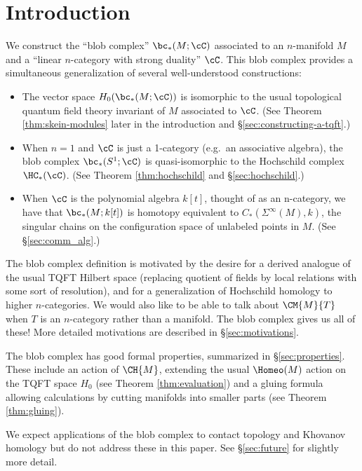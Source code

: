 
\section{Introduction}

We construct the ``blob complex'' $\bc_*(M; \cC)$ associated to an $n$-manifold $M$ and a ``linear $n$-category with strong duality'' $\cC$.
This blob complex provides a simultaneous generalization of several well-understood constructions:
\begin{itemize}
\item The vector space $H_0(\bc_*(M; \cC))$ is isomorphic to the usual topological quantum field theory invariant of $M$ associated to $\cC$.
(See Theorem \ref{thm:skein-modules} later in the introduction and \S \ref{sec:constructing-a-tqft}.)
\item When $n=1$ and $\cC$ is just a 1-category (e.g.\ an associative algebra), 
the blob complex $\bc_*(S^1; \cC)$ is quasi-isomorphic to the Hochschild complex $\HC_*(\cC)$.
(See Theorem \ref{thm:hochschild} and \S \ref{sec:hochschild}.)
\item When $\cC$ is the polynomial algebra $k[t]$, thought of as an n-category, we have 
that $\bc_*(M; k[t])$ is homotopy equivalent to $C_*(\Sigma^\infty(M), k)$, the singular chains
on the configuration space of unlabeled points in $M$. (See \S \ref{sec:comm_alg}.)
\end{itemize}
The blob complex definition is motivated by the desire for a derived analogue of the usual TQFT Hilbert space 
(replacing quotient of fields by local relations with some sort of resolution), 
and for a generalization of Hochschild homology to higher $n$-categories.
We would also like to be able to talk about $\CM{M}{T}$ when $T$ is an $n$-category rather than a manifold.
The blob complex gives us all of these! More detailed motivations are described in \S \ref{sec:motivations}.

The blob complex has good formal properties, summarized in \S \ref{sec:properties}.
These include an action of $\CH{M}$, 
extending the usual $\Homeo(M)$ action on the TQFT space $H_0$ (see Theorem \ref{thm:evaluation}) and a gluing 
formula allowing calculations by cutting manifolds into smaller parts (see Theorem \ref{thm:gluing}).

We expect applications of the blob complex to contact topology and Khovanov homology but do not address these in this paper.
See \S \ref{sec:future} for slightly more detail.

